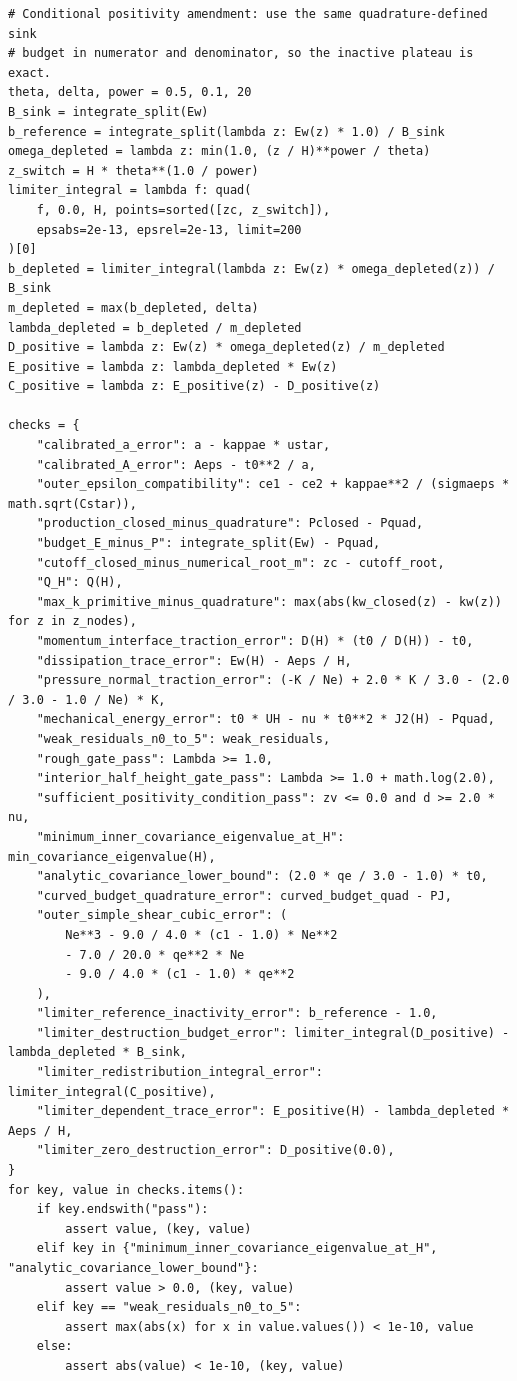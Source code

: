 \documentclass[11pt,a4paper]{article}
\numberwithin{equation}{section}
\begin{document}
\begin{lstlisting}[style=py]
# Conditional positivity amendment: use the same quadrature-defined sink
# budget in numerator and denominator, so the inactive plateau is exact.
theta, delta, power = 0.5, 0.1, 20
B_sink = integrate_split(Ew)
b_reference = integrate_split(lambda z: Ew(z) * 1.0) / B_sink
omega_depleted = lambda z: min(1.0, (z / H)**power / theta)
z_switch = H * theta**(1.0 / power)
limiter_integral = lambda f: quad(
    f, 0.0, H, points=sorted([zc, z_switch]),
    epsabs=2e-13, epsrel=2e-13, limit=200
)[0]
b_depleted = limiter_integral(lambda z: Ew(z) * omega_depleted(z)) / B_sink
m_depleted = max(b_depleted, delta)
lambda_depleted = b_depleted / m_depleted
D_positive = lambda z: Ew(z) * omega_depleted(z) / m_depleted
E_positive = lambda z: lambda_depleted * Ew(z)
C_positive = lambda z: E_positive(z) - D_positive(z)

checks = {
    "calibrated_a_error": a - kappae * ustar,
    "calibrated_A_error": Aeps - t0**2 / a,
    "outer_epsilon_compatibility": ce1 - ce2 + kappae**2 / (sigmaeps * math.sqrt(Cstar)),
    "production_closed_minus_quadrature": Pclosed - Pquad,
    "budget_E_minus_P": integrate_split(Ew) - Pquad,
    "cutoff_closed_minus_numerical_root_m": zc - cutoff_root,
    "Q_H": Q(H),
    "max_k_primitive_minus_quadrature": max(abs(kw_closed(z) - kw(z)) for z in z_nodes),
    "momentum_interface_traction_error": D(H) * (t0 / D(H)) - t0,
    "dissipation_trace_error": Ew(H) - Aeps / H,
    "pressure_normal_traction_error": (-K / Ne) + 2.0 * K / 3.0 - (2.0 / 3.0 - 1.0 / Ne) * K,
    "mechanical_energy_error": t0 * UH - nu * t0**2 * J2(H) - Pquad,
    "weak_residuals_n0_to_5": weak_residuals,
    "rough_gate_pass": Lambda >= 1.0,
    "interior_half_height_gate_pass": Lambda >= 1.0 + math.log(2.0),
    "sufficient_positivity_condition_pass": zv <= 0.0 and d >= 2.0 * nu,
    "minimum_inner_covariance_eigenvalue_at_H": min_covariance_eigenvalue(H),
    "analytic_covariance_lower_bound": (2.0 * qe / 3.0 - 1.0) * t0,
    "curved_budget_quadrature_error": curved_budget_quad - PJ,
    "outer_simple_shear_cubic_error": (
        Ne**3 - 9.0 / 4.0 * (c1 - 1.0) * Ne**2
        - 7.0 / 20.0 * qe**2 * Ne
        - 9.0 / 4.0 * (c1 - 1.0) * qe**2
    ),
    "limiter_reference_inactivity_error": b_reference - 1.0,
    "limiter_destruction_budget_error": limiter_integral(D_positive) - lambda_depleted * B_sink,
    "limiter_redistribution_integral_error": limiter_integral(C_positive),
    "limiter_dependent_trace_error": E_positive(H) - lambda_depleted * Aeps / H,
    "limiter_zero_destruction_error": D_positive(0.0),
}
for key, value in checks.items():
    if key.endswith("pass"):
        assert value, (key, value)
    elif key in {"minimum_inner_covariance_eigenvalue_at_H", "analytic_covariance_lower_bound"}:
        assert value > 0.0, (key, value)
    elif key == "weak_residuals_n0_to_5":
        assert max(abs(x) for x in value.values()) < 1e-10, value
    else:
        assert abs(value) < 1e-10, (key, value)


\end{lstlisting}
\end{document}
